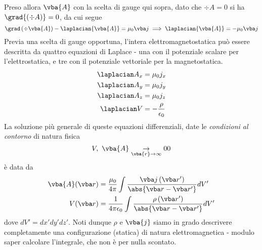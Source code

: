 Preso allora $\vba{A}$ con la scelta di gauge qui sopra, dato che $\div{A}=0$ si ha $\grad{\left(\div{A}\right)}=0$, da cui segue
\begin{equation*}
	\grad \left( \div{\vba{A}}\right) - \laplacian{\vba{A}}=\mu_0 \vba j\implies \laplacian{\vba{A}}=-\mu_0 \vba j
\end{equation*}
Previa una scelta di gauge opportuna, l'intera elettromagnetostatica può essere descritta da quattro equazioni di Laplace - una con il potenziale scalare per l'elettrostatica, e tre con il potenziale vettoriale per la magnetostatica.
\begin{align}
	\laplacian A_x&=\mu_0 j_x\\
	\laplacian A_y&=\mu_0 j_y\\
	\laplacian A_z&=\mu_0 j_z\\
	\laplacian V&=-\frac{\rho}{\epsilon_0}
\end{align}
La soluzione più generale di queste equazioni differenziali, date le \textit{condizioni al contorno} di natura fisica
\begin{equation*}
	V,\ \vba{A}\underset{\vba{r}\to\infty}{\to}0 0
\end{equation*}
è data da
\begin{align}
	\vba{A}(\vba r)&=\frac{\mu_0}{4\pi}\int\frac{\vba j\left(\vba r'\right)}{\abs{\vba r-\vba r'}} dV'\\
	V(\vba r)&=\frac{1}{4\pi\epsilon_0}\int \frac{\rho\left(\vba r'\right)}{\abs{\vba r-\vba r'}}dV'
\end{align}
dove $dV'=dx'dy'dz'$.
Noti dunque $\rho$ e $\vba{j}$ siamo in grado descrivere completamente una configurazione (statica) di natura elettromagnetica - modulo saper calcolare l'integrale, che non è per nulla scontato.
